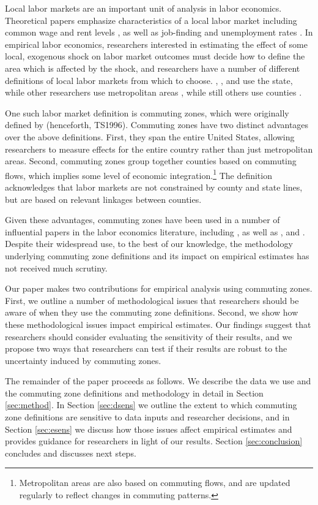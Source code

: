 Local labor markets are an important unit of analysis in labor economics. Theoretical papers emphasize characteristics of a local labor market including common wage and rent levels \citep{Roback1982,Moretti2011}, as well as job-finding and unemployment rates \citep{HL2012,SS2014}. In empirical labor economics, researchers interested in estimating the effect of some local, exogenous shock on labor market outcomes must decide how to define the area which is affected by the shock, and researchers have a number of different definitions of local labor markets from which to choose. \citet{BK1992}, \citet{Wozniak2010}, and \citet{KW2011} use the state, while other researchers use metropolitan areas \citep{BH2000,Card2001,Notowidigdo2011,Diamond2016}, while still others use counties \citep{MRR2015,FGS2015}.

One such labor market definition is commuting zones, which were originally defined by \citet{TS1996} (henceforth, TS1996). Commuting zones have two distinct advantages over the above definitions. First, they span the entire United States, allowing researchers to measure effects for the entire country rather than just metropolitan areas. Second, commuting zones group together counties based on commuting flows, which implies some level of economic integration.\footnote{Metropolitan areas are also based on commuting flows, and are updated regularly to reflect changes in commuting patterns.} The definition acknowledges that labor markets are not constrained by county and state lines, but are based on relevant linkages between counties.

Given these advantages, commuting zones have been used in a number of influential papers in the labor economics literature, including \citet{ADH2013}, as well as \citet{Yagan2016}, \citet{Restrepo2015} and \citet{AM2015}. Despite their widespread use, to the best of our knowledge, the methodology underlying commuting zone definitions and its impact on empirical estimates has not received much scrutiny. 

Our paper makes two contributions for empirical analysis using commuting zones. First, we outline a number of methodological issues that researchers should be aware of when they use the commuting zone definitions. Second, we show how these methodological issues impact empirical estimates. Our findings suggest that researchers should consider evaluating the sensitivity of their results, and we propose two ways that researchers can test if their results are robust to the uncertainty induced by commuting zones. 

The remainder of the paper proceeds as follows. We describe the data we use and the commuting zone definitions and methodology in detail in Section \ref{sec:method}. In Section \ref{sec:dsens} we outline the extent to which commuting zone definitions are sensitive to data inputs and researcher decisions, and in Section \ref{sec:esens} we discuss how those issues affect empirical estimates and provides guidance for researchers in light of our results. Section \ref{sec:conclusion} concludes and discusses next steps. 


